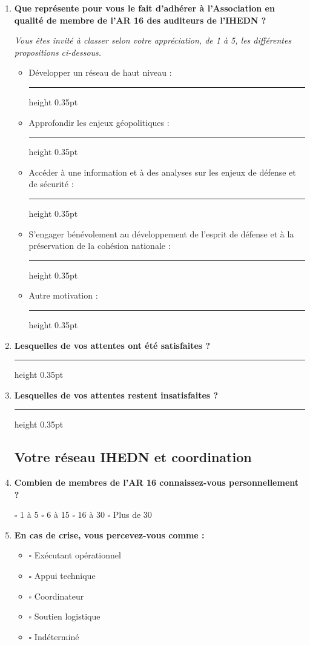 \documentclass[12pt,a4paper]{article}
\newcommand{\Case}{\(\square\)}
\newcommand{\Ligne}{\leavevmode\leaders\hrule height 0.35pt\hfill\kern0pt}
\newcommand{\Question}[1]{\item \textbf{#1}\par\vspace{0.1em}}
\newcommand{\Consigne}[1]{\par{\small\itshape #1}\par}
\begin{document}
\begin{enumerate}[label=\textbf{\arabic*.},leftmargin=0pt,itemindent=1.9em,labelwidth=1.4em,labelsep=0.5em,resume]

\Question{Que représente pour vous le fait d'adhérer à l'Association en qualité de membre de l'AR 16 des auditeurs de l'IHEDN ?}

\Consigne{Vous êtes invité à classer selon votre appréciation, de 1 à 5, les différentes propositions ci-dessous.}

\begin{itemize}[leftmargin=1.5cm]
    \item Développer un réseau de haut niveau : \Ligne
    \item Approfondir les enjeux géopolitiques : \Ligne
    \item Accéder à une information et à des analyses sur les enjeux de défense et de sécurité : \Ligne
    \item S'engager bénévolement au développement de l'esprit de défense et à la préservation de la cohésion nationale :

    \Ligne
    \item Autre motivation : \Ligne
\end{itemize}

\Question{Lesquelles de vos attentes ont été satisfaites ?}

\Ligne

\Question{Lesquelles de vos attentes restent insatisfaites ?}

\Ligne

\subsection{Votre réseau IHEDN et coordination}

\Question{Combien de membres de l'AR 16 connaissez-vous personnellement ?}

\Case{} 1 à 5 \hspace{1cm} \Case{} 6 à 15 \hspace{1cm} \Case{} 16 à 30 \hspace{1cm} \Case{} Plus de 30

\Question{En cas de crise, vous percevez-vous comme :}

\begin{itemize}[leftmargin=1.5cm]
    \item[] \Case{} Exécutant opérationnel
    \item[] \Case{} Appui technique
    \item[] \Case{} Coordinateur
    \item[] \Case{} Soutien logistique
    \item[] \Case{} Indéterminé
\end{itemize}


\end{enumerate}
\end{document}
